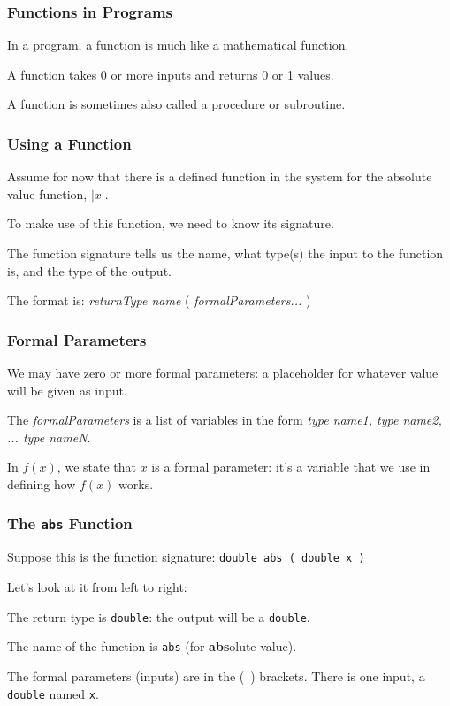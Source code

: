 \begin{frame}
\frametitle{Functions in Programs}
In a program, a function is much like a mathematical function.

A function takes 0 or more inputs and returns 0 or 1 values.

A function is sometimes also called a procedure or subroutine.

\end{frame}

\begin{frame}
\frametitle{Using a Function}
Assume for now that there is a defined function in the system for the absolute value function, $|x|$.

To make use of this function, we need to know its \alert{signature}.

The function signature tells us the name, what type(s) the input to the function is, and the type of the output.

The format is: \textit{returnType name} ( \textit{formalParameters...} )

\end{frame}

\begin{frame}
\frametitle{Formal Parameters}

We may have zero or more \alert{formal parameters}: a placeholder for whatever value will be given as input. 

The \textit{formalParameters} is a list of variables in the form \textit{type name1, type name2, ... type nameN}.

In $f(x)$, we state that $x$ is a formal parameter: it's a variable that we use in defining how $f(x)$ works.

\end{frame}

\begin{frame}
\frametitle{The \texttt{abs} Function}

Suppose this is the function signature: \texttt{double abs ( double x )}

Let's look at it from left to right:

The return type is \texttt{double}: the output will be a \texttt{double}.

The name of the function is \texttt{abs} (for \textbf{abs}olute value).

The formal parameters (inputs) are in the (~) brackets. There is one input, a \texttt{double} named \texttt{x}.


\end{frame}

